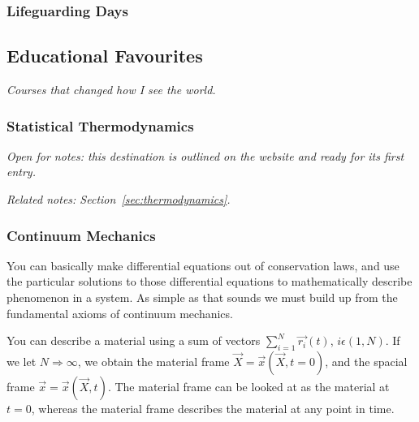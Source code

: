\documentclass{article}
\newcounter{subsubsubsection}[subsubsection]
\begin{document}
\newpage 

\subsubsection{Lifeguarding Days}\label{sec:lifeguarding-days}

\newpage 

\subsection{Educational Favourites}\label{sec:educational-favourites}
\textit{Courses that changed how I see the world.}

\subsubsection{Statistical Thermodynamics}\label{sec:statistical-thermodynamics}
\textit{Open for notes: this destination is outlined on the website and ready for its first entry.}

\textit{Related notes: Section~\ref{sec:thermodynamics}.}

\subsubsection{Continuum Mechanics}\label{sec:continuum-mechanics}

You can basically make differential equations out of conservation laws, and use the particular solutions to those differential equations to mathematically describe phenomenon in a system. As simple as that sounds we must build up from the fundamental axioms of continuum mechanics. 

You can describe a material using a sum of vectors \begin{math} \sum_{i=1}^{N} \vec{r_{i}}(t) \end{math}, \begin{math} i \epsilon (1,N) \end{math}. If we let \begin{math} N \Rightarrow \infty \end{math}, we obtain the material frame \begin{math} \vec{X} = \vec{x}(\vec{X} , t = 0 ) \end{math}, and the spacial frame \begin{math} \vec{x} = \vec{x}(\vec{X} , t ) \end{math}. The material frame can be looked at as the material at \begin{math} t = 0 \end{math}, whereas the material frame describes the material at any point in time.
\end{document}
